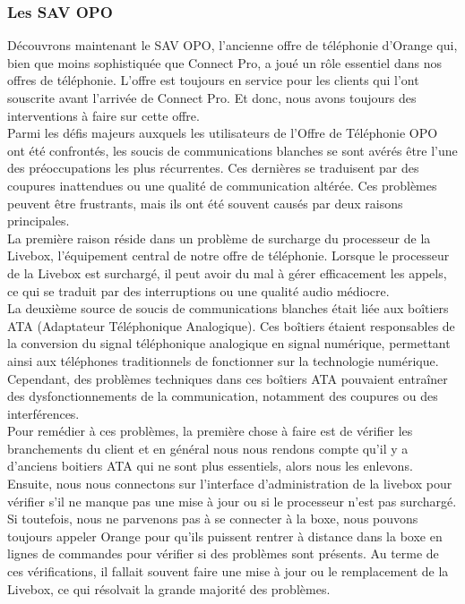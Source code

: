 \documentclass[12pt, a4paper]{article}
\begin{document}
\newpage
\subsubsection{Les SAV OPO}
Découvrons maintenant le SAV OPO, l'ancienne offre de
téléphonie d'Orange qui, bien que moins sophistiquée
que Connect Pro, a joué un rôle essentiel dans nos offres
de téléphonie. L'offre est toujours en service pour les clients
qui l'ont souscrite avant l'arrivée de Connect Pro. Et donc, 
nous avons toujours des interventions à faire sur cette offre.\\

Parmi les défis majeurs auxquels les utilisateurs de l'Offre de
Téléphonie OPO ont été confrontés, les soucis de communications
blanches se sont avérés être l'une des préoccupations les plus
récurrentes. Ces dernières se traduisent par des 
coupures inattendues ou une qualité de communication
altérée. Ces problèmes peuvent être frustrants, mais ils ont été
souvent causés par deux raisons principales.\\

La première raison réside dans un problème de surcharge du
processeur de la Livebox, l'équipement central de notre offre
de téléphonie. Lorsque le processeur de la Livebox est surchargé,
il peut avoir du mal à gérer efficacement les appels, ce qui se
traduit par des interruptions ou une qualité audio médiocre.\\

La deuxième source de soucis de communications blanches était
liée aux boîtiers ATA (Adaptateur Téléphonique Analogique).
Ces boîtiers étaient responsables de la conversion du signal
téléphonique analogique en signal numérique, permettant ainsi
aux téléphones traditionnels de fonctionner sur la technologie
numérique. Cependant, des problèmes techniques dans ces boîtiers
ATA pouvaient entraîner des dysfonctionnements de la communication,
notamment des coupures ou des interférences.\\

Pour remédier à ces problèmes, la première chose à faire est 
de vérifier les branchements du client et 
en général nous nous rendons compte qu'il y a d'anciens 
boitiers ATA qui ne sont plus essentiels, alors nous 
les enlevons. Ensuite, nous
nous connectons sur l'interface d'administration de la livebox 
pour vérifier s'il ne manque pas une mise à jour ou si le 
processeur n'est pas surchargé. Si toutefois, nous 
ne parvenons pas à se connecter à la boxe, nous pouvons 
toujours appeler Orange pour qu'ils puissent rentrer 
à distance dans la boxe en lignes de commandes pour 
vérifier si des problèmes sont présents.
Au terme de ces vérifications, il fallait souvent 
faire une mise à jour ou le remplacement de la Livebox, 
ce qui résolvait la grande majorité des problèmes.\\
\end{document}
